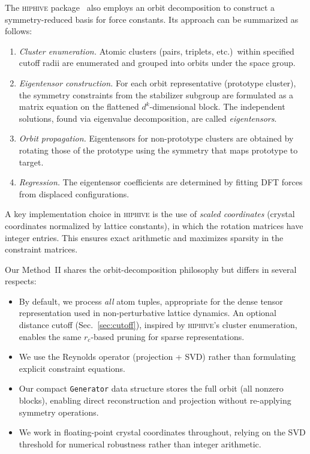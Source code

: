 \documentclass[twocolumn,amsmath,amssymb,aps,prb,10pt,floatfix]{revtex4-2}
\begin{document}
The \textsc{hiphive} package~\cite{Eriksson2019,Fransson2020} also employs an orbit decomposition to construct a symmetry-reduced basis for force constants.
Its approach can be summarized as follows:
\begin{enumerate}
\item \emph{Cluster enumeration.} Atomic clusters (pairs, triplets, etc.)\ within specified cutoff radii are enumerated and grouped into orbits under the space group.
\item \emph{Eigentensor construction.} For each orbit representative (prototype cluster), the symmetry constraints from the stabilizer subgroup are formulated as a matrix equation on the flattened $d^k$-dimensional block. The independent solutions, found via eigenvalue decomposition, are called \emph{eigentensors}.
\item \emph{Orbit propagation.} Eigentensors for non-prototype clusters are obtained by rotating those of the prototype using the symmetry that maps prototype to target.
\item \emph{Regression.} The eigentensor coefficients are determined by fitting DFT forces from displaced configurations.
\end{enumerate}

A key implementation choice in \textsc{hiphive} is the use of \emph{scaled coordinates} (crystal coordinates normalized by lattice constants), in which the rotation matrices have integer entries. This ensures exact arithmetic and maximizes sparsity in the constraint matrices.

Our Method~II shares the orbit-decomposition philosophy but differs in several respects:
\begin{itemize}
\item By default, we process \emph{all} atom tuples, appropriate for the dense tensor representation used in non-perturbative lattice dynamics. An optional distance cutoff (Sec.~\ref{sec:cutoff}), inspired by \textsc{hiphive}'s cluster enumeration, enables the same $r_c$-based pruning for sparse representations.
\item We use the Reynolds operator (projection + SVD) rather than formulating explicit constraint equations.
\item Our compact \texttt{Generator} data structure stores the full orbit (all nonzero blocks), enabling direct reconstruction and projection without re-applying symmetry operations.
\item We work in floating-point crystal coordinates throughout, relying on the SVD threshold for numerical robustness rather than integer arithmetic.
\end{itemize}
\end{document}
